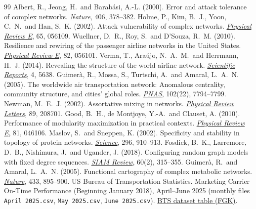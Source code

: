 \documentclass[12pt, a4paper]{article}
\begin{document}
\small
\begin{thebibliography}{99}\setlength\itemsep{1pt}\setlength\parskip{0pt}
 Albert, R., Jeong, H.\ and Barab\'asi, A.-L. (2000). Error and attack tolerance of complex networks. \href{https://doi.org/10.1038/35019019}{\emph{Nature}}, 406, 378--382.
 Holme, P., Kim, B.\ J., Yoon, C.\ N.\ and Han, S.\ K. (2002). Attack vulnerability of complex networks. \href{https://doi.org/10.1103/PhysRevE.65.056109}{\emph{Physical Review E}}, 65, 056109.
 Wuellner, D.\ R., Roy, S.\ and D'Souza, R.\ M. (2010). Resilience and rewiring of the passenger airline networks in the United States. \href{https://doi.org/10.1103/PhysRevE.82.056101}{\emph{Physical Review E}}, 82, 056101.
 Verma, T., Ara\'ujo, N.\ A.\ M.\ and Herrmann, H.\ J. (2014). Revealing the structure of the world airline network. \href{https://doi.org/10.1038/srep05638}{\emph{Scientific Reports}}, 4, 5638.
 Guimer\`a, R., Mossa, S., Turtschi, A.\ and Amaral, L.\ A.\ N. (2005). The worldwide air transportation network: Anomalous centrality, community structure, and cities' global roles. \href{https://doi.org/10.1073/pnas.0407994102}{\emph{PNAS}}, 102(22), 7794--7799.
 Newman, M.\ E.\ J. (2002). Assortative mixing in networks. \href{https://doi.org/10.1103/PhysRevLett.89.208701}{\emph{Physical Review Letters}}, 89, 208701.
 Good, B.\ H., de Montjoye, Y.-A.\ and Clauset, A. (2010). Performance of modularity maximization in practical contexts. \href{https://doi.org/10.1103/PhysRevE.81.046106}{\emph{Physical Review E}}, 81, 046106.
 Maslov, S.\ and Sneppen, K. (2002). Specificity and stability in topology of protein networks. \href{https://doi.org/10.1126/science.1065103}{\emph{Science}}, 296, 910--913.
 Fosdick, B.\ K., Larremore, D.\ B., Nishimura, J.\ and Ugander, J. (2018). Configuring random graph models with fixed degree sequences. \href{https://doi.org/10.1137/16M1087175}{\emph{SIAM Review}}, 60(2), 315--355.
 Guimer\`a, R.\ and Amaral, L.\ A.\ N. (2005). Functional cartography of complex metabolic networks. \href{https://doi.org/10.1038/nature03288}{\emph{Nature}}, 433, 895--900.
 US Bureau of Transportation Statistics. Marketing Carrier On-Time Performance (Beginning January 2018), April--June 2025 (monthly files \texttt{April 2025.csv}, \texttt{May 2025.csv}, \texttt{June 2025.csv}). \href{https://www.transtats.bts.gov/TableInfo.asp?QO_fu146_anzr=b0-gvzr&V0s1_b0yB=D&gnoyr_VQ=FGK}{BTS dataset table (FGK)}.

\end{thebibliography}
\end{document}
